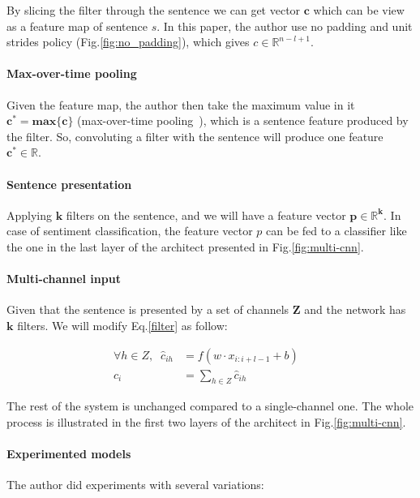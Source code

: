 By slicing the filter through the sentence we can get vector \(\bm{c}\) which can be view as a feature map of sentence \(s\).
In this paper, the author use no padding and unit strides policy (Fig.\ref{fig:no_padding}), which gives \(c \in \mathbb{R}^{n-l+1}\).

\paragraph{Max-over-time pooling}\label{sec:max-overtime-pooling} Given the feature map, the author then take the maximum value in it \(\bm{c^* = max\{c\}}\) (max-over-time pooling~\cite{nlp-scratch}), which is a sentence feature produced by the filter.
So, convoluting a filter with the sentence will produce one feature \(\bm{c^* \in \mathbb{R}}\).

\paragraph{Sentence presentation} Applying \(\bm{k}\) filters on the sentence, and we will have a feature vector \(\bm{p \in \mathbb{R}^k}\).
In case of sentiment classification, the feature vector \(p\) can be fed to a classifier like the one in the last layer of the architect presented in Fig.\ref{fig:multi-cnn}.

\paragraph{Multi-channel input} Given that the sentence is presented by a set of channels \(\bm{Z}\) and the network has \(\bm{k}\) filters.
We will modify Eq.\eqref{filter} as follow:

\begin{align}
    \forall h \in Z, \; \; \hat{c}_{ih} &= f(w \cdot x_{i:i+l-1} + b)& \\
    c_i &= \sum_{h \in Z} \hat{c}_{ih}&
\end{align}

The rest of the system is unchanged compared to a single-channel one.
The whole process is illustrated in the first two layers of the architect in Fig.\ref{fig:multi-cnn}.

\paragraph{Experimented models} The author did experiments with several variations:


